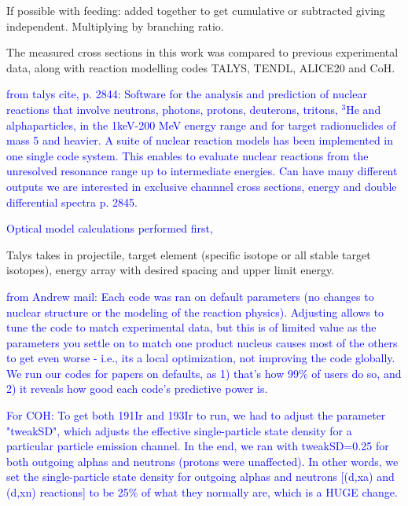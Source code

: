 \documentclass[a4paper,11pt,twoside]{book}
\begin{document}
If possible with feeding: added together to get cumulative or subtracted giving independent. Multiplying by branching ratio. 

The measured cross sections in this work was compared to previous experimental data, along with reaction modelling codes TALYS, TENDL, ALICE20 and CoH. \\

\noindent 
\textcolor{blue}{from talys cite, p. 2844: Software for the analysis and prediction of nuclear reactions that involve neutrons, photons, protons, deuterons, tritons, $^3$He and alphaparticles, in the 1keV-200 MeV energy range and for target radionuclides of mass 5 and heavier. A suite of nuclear reaction models has been implemented in one single code system. This enables to evaluate nuclear reactions from the unresolved resonance range up to intermediate energies. Can have many different outputs we are interested in exclusive channnel cross sections, energy and double differential spectra p. 2845. 

Optical model calculations performed first, }

Talys takes in projectile, target element (specific isotope or all stable target isotopes), energy array with desired spacing and upper limit energy. 

\textcolor{blue}{from Andrew mail: Each code was ran on default parameters (no changes to nuclear structure or the modeling of the reaction physics). Adjusting allows to tune the code to match experimental data, but this is of limited value as the parameters you settle on to match one product nucleus causes most of the others to get even worse - i.e., its a local optimization, not improving the code globally.  We run our codes for papers on defaults, as 1) that's how 99\% of users do so, and 2) it reveals how good each code's predictive power is. 

For COH: To get both 191Ir and 193Ir to run, we had to adjust the parameter "tweakSD", which adjusts the effective single-particle state density for a particular particle emission channel.  In the end, we ran with tweakSD=0.25  for both outgoing alphas and neutrons  (protons were unaffected).  In other words, we set the single-particle state density for outgoing alphas and neutrons [(d,xa) and (d,xn) reactions]  to be 25\% of what they normally are, which is a HUGE change.} 
\end{document}
